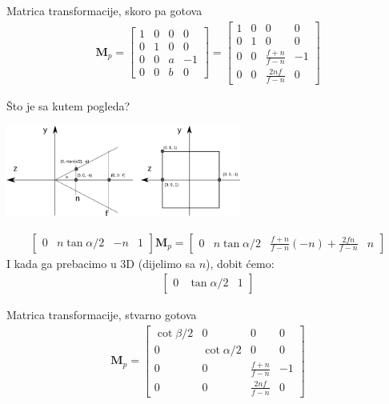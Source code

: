 \documentclass[9pt]{beamer}
\begin{document}
\begin{frame}{Matrica transformacije, skoro pa gotova}
	\begin{align*}
	\mathbf{M}_p = \left[ \begin{array}{cccc}
	1 & 0 & 0 & 0 \\
	0 & 1 & 0 & 0 \\
	0 & 0 & a & -1 \\
	0 & 0 & b & 0 
	\end{array} \right] = \left[ \begin{array}{cccc}
	1 & 0 & 0 & 0 \\
	0 & 1 & 0 & 0 \\
	0 & 0 & \frac{f+n}{f-n} & -1 \\
	0 & 0 & \frac{2nf}{f-n} & 0 
	\end{array} \right]
	\end{align*}
\end{frame}

\begin{frame}{Što je sa kutem pogleda?}
	\begin{center}
		\includegraphics[height=3cm]{slike/p04_08.png}
	\end{center}
	\begin{align*}
	\left[ \begin{array}{cccc}0 & n \tan \alpha/2 & -n & 1 \end{array} \right] \mathbf{M}_p =  \left[ \begin{array}{cccc}0 & n \tan \alpha/2 & \frac{f+n}{f-n}(-n)+ \frac{2fn}{f-n} & n \end{array} \right]  
	\end{align*}
	I kada ga prebacimo u 3D (dijelimo sa $n$), dobit ćemo:
	\begin{align*}
	\left[ \begin{array}{ccc}0 & \tan \alpha/2 & 1 \end{array} \right]
	\end{align*}
\end{frame}

\begin{frame}{Matrica transformacije, stvarno gotova}
	\begin{align*}
	\mathbf{M}_p =  \left[ \begin{array}{cccc}
	\cot \beta/2 & 0 & 0 & 0 \\
	0 & \cot \alpha/2 & 0 & 0 \\
	0 & 0 & \frac{f+n}{f-n} & -1 \\
	0 & 0 & \frac{2nf}{f-n} & 0 
	\end{array} \right]
	\end{align*}
\end{frame}
\end{document}
